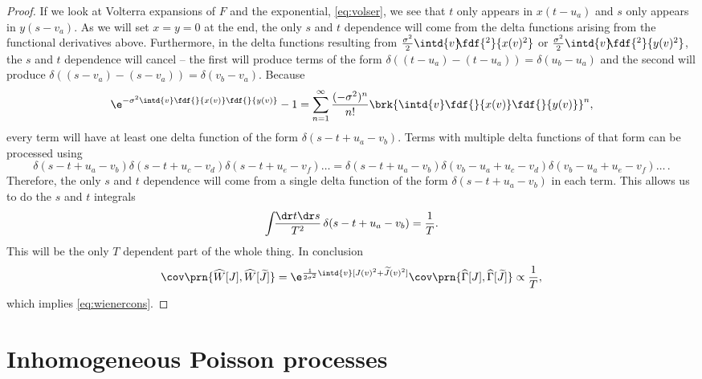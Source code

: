 \documentclass[12pt]{article}
\newcommand{\tj}{\widetilde{J}}
\newcommand{\hz}{\widehat{\Gamma}}
\newcommand{\hw}{\widehat{W}}
\begin{document}
\begin{proof}
  If we look at Volterra expansions of $F$ and the exponential, \eqref{eq:volser}, we see that $t$ only appears in $x(t-u_a)$ and $s$ only appears in $y(s-v_a)$.
  As we will set $x=y=0$ at the end, the only $s$ and $t$ dependence will come from the delta functions arising from the functional derivatives above.
  Furthermore, in the delta functions resulting from $\frac{\sigma^2}{2} \intd{v}\!\!\fdf{^2}{x(v)^2}$ or $\frac{\sigma^2}{2} \intd{v}\!\!\fdf{^2}{y(v)^2}$, the $s$ and $t$ dependence will cancel -- the first will produce terms of the form \( \delta((t-u_a) - (t-u_a)) = \delta(u_b-u_a) \) and the second will produce \( \delta((s-v_a) - (s-v_a)) = \delta(v_b-v_a) \).
  Because
  \begin{equation*}
    \e^{-\sigma^2\intd{v}\fdf{}{x(v)}\fdf{}{y(v)}}-1
      = \sum_{n=1}^\infty \frac{(-\sigma^2)^n}{n!}
        \brk{ \intd{v}\fdf{}{x(v)}\fdf{}{y(v)} }^n,
  \end{equation*}
  every term will have at least one delta function of the form $\delta(s-t+u_a-v_b)$.
  Terms with multiple delta functions of that form can be processed using
  \begin{equation*}
    \delta(s-t+u_a-v_b)\delta(s-t+u_c-v_d)\delta(s-t+u_e-v_f)\ldots
    = \delta(s-t+u_a-v_b)\delta(v_b-u_a+u_c-v_d)\delta(v_b-u_a+u_e-v_f)\ldots \,.
  \end{equation*}
  Therefore, the only $s$ and $t$ dependence will come from a single delta function of the form $\delta(s-t+u_a-v_b)$ in each term.
  This allows us to do the $s$ and $t$ integrals
  \begin{equation*}
    \int\!\!\frac{\dr t\dr s}{T^2}\,\delta(s-t+u_a-v_b) = \frac{1}{T}.
  \end{equation*}
  This will be the only $T$ dependent part of the whole thing.
  In conclusion
  \begin{equation}\label{eq:wienergenconspf}
    \cov\prn{\hw[J],\hw[\tj]}
      = \e^{\frac{1}{2\sigma^2} \intd{v}[J(v)^2 + \tj(v)^2]} \cov\prn{\hz[J],\hz[\tj]}
      \propto \frac{1}{T},
  \end{equation}
  which implies \eqref{eq:wienercons}.
\end{proof}



\section{Inhomogeneous Poisson processes}\label{sec:poisson}
\end{document}
